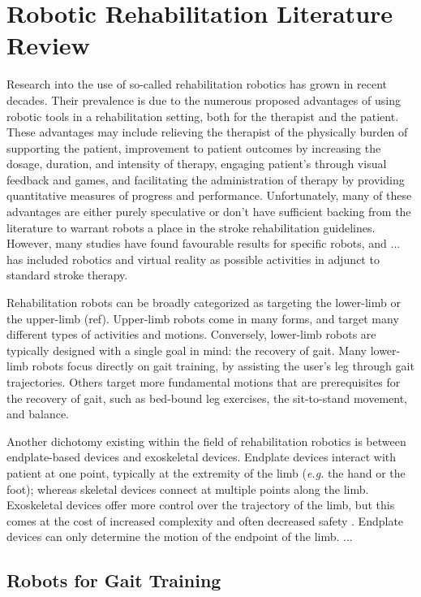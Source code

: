 \documentclass[12pt]{report}
\begin{document}
\section{Robotic Rehabilitation Literature Review}

	Research into the use of so-called rehabilitation robotics has grown in recent decades. Their prevalence is due to the numerous proposed advantages of using robotic tools in a rehabilitation setting, both for the therapist and the patient. These advantages may include relieving the therapist of the physically burden of supporting the patient, improvement to patient outcomes by increasing the dosage, duration, and intensity of therapy, engaging patient's through visual feedback and games, and facilitating the administration of therapy by providing quantitative measures of progress and performance. Unfortunately, many of these advantages are either purely speculative or don't have sufficient backing from the literature to warrant robots a place in the stroke rehabilitation guidelines. However, many studies have found favourable results for specific robots, and ... has included robotics and virtual reality as possible activities in adjunct to standard stroke therapy. 
	
	Rehabilitation robots can be broadly categorized as targeting the lower-limb or the upper-limb (ref). Upper-limb robots come in many forms, and target many different types of activities and motions. Conversely, lower-limb robots are typically designed with a single goal in mind: the recovery of gait. Many lower-limb robots focus directly on gait training, by assisting the user's leg through gait trajectories. Others target more fundamental motions that are prerequisites for the recovery of gait, such as bed-bound leg exercises, the sit-to-stand movement, and balance. 
	
	Another dichotomy existing within the field of rehabilitation robotics is between endplate-based devices and exoskeletal devices. Endplate devices interact with patient at one point, typically at the extremity of the limb (\textit{e.g.} the hand or the foot); whereas skeletal devices connect at multiple points along the limb. Exoskeletal devices offer more control over the trajectory of the limb, but this comes at the cost of increased complexity and often decreased safety \cite{Chang2013}. Endplate devices can only determine the motion of the endpoint of the limb. ... 
	
	\subsection{Robots for Gait Training}
	
\end{document}

